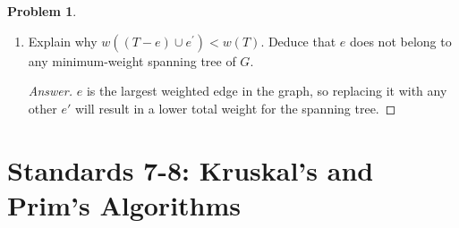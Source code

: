 \documentclass[11pt]{article}
\theoremstyle{definition}
\theoremstyle{definition}
\newtheorem{required}{Problem}
\theoremstyle{definition}
\begin{document}
\begin{required}
\begin{enumerate}[label=(\alph*)]
\vskip 20pt
\item Explain why $w( (T - e) \cup e^{\prime}) < w(T)$. Deduce that $e$ does not belong to any minimum-weight spanning tree of $G$.
\begin{proof}[Answer]
$e$ is the largest weighted edge in the graph, so replacing it with any other $e\prime$ will result in a lower total weight for the spanning tree.
\end{proof}
\end{enumerate}
\end{required}



\newpage
\section{Standards 7-8: Kruskal's and Prim's Algorithms}
\end{document}
